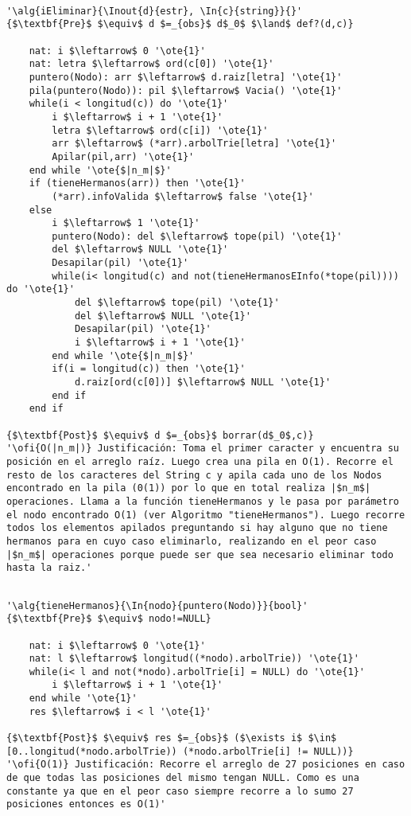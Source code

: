 \begin{lstlisting}[mathescape]

'\alg{iEliminar}{\Inout{d}{estr}, \In{c}{string}}{}'
{$\textbf{Pre}$ $\equiv$ d $=_{obs}$ d$_0$ $\land$ def?(d,c)}

	nat: i $\leftarrow$ 0 '\ote{1}'
	nat: letra $\leftarrow$ ord(c[0]) '\ote{1}'
	puntero(Nodo): arr $\leftarrow$ d.raiz[letra] '\ote{1}'
	pila(puntero(Nodo)): pil $\leftarrow$ Vacia() '\ote{1}'
	while(i < longitud(c)) do '\ote{1}'
		i $\leftarrow$ i + 1 '\ote{1}'
		letra $\leftarrow$ ord(c[i]) '\ote{1}'
		arr $\leftarrow$ (*arr).arbolTrie[letra] '\ote{1}'
		Apilar(pil,arr) '\ote{1}'
	end while '\ote{$|n_m|$}'
	if (tieneHermanos(arr)) then '\ote{1}'
		(*arr).infoValida $\leftarrow$ false '\ote{1}'
	else
		i $\leftarrow$ 1 '\ote{1}'
		puntero(Nodo): del $\leftarrow$ tope(pil) '\ote{1}'
		del $\leftarrow$ NULL '\ote{1}'
		Desapilar(pil) '\ote{1}'
		while(i< longitud(c) and not(tieneHermanosEInfo(*tope(pil)))) do '\ote{1}'
			del $\leftarrow$ tope(pil) '\ote{1}'
			del $\leftarrow$ NULL '\ote{1}'
			Desapilar(pil) '\ote{1}'
			i $\leftarrow$ i + 1 '\ote{1}'
		end while '\ote{$|n_m|$}'
		if(i = longitud(c)) then '\ote{1}'
			d.raiz[ord(c[0])] $\leftarrow$ NULL '\ote{1}'
		end if
	end if

{$\textbf{Post}$ $\equiv$ d $=_{obs}$ borrar(d$_0$,c)}
'\ofi{O(|n_m|)} Justificación: Toma el primer caracter y encuentra su posición en el arreglo raíz. Luego crea una pila en O(1). Recorre el resto de los caracteres del String c y apila cada uno de los Nodos encontrado en la pila (0(1)) por lo que en total realiza |$n_m$| operaciones. Llama a la función tieneHermanos y le pasa por parámetro el nodo encontrado O(1) (ver Algoritmo "tieneHermanos"). Luego recorre todos los elementos apilados preguntando si hay alguno que no tiene hermanos para en cuyo caso eliminarlo, realizando en el peor caso |$n_m$| operaciones porque puede ser que sea necesario eliminar todo hasta la raiz.'

\end{lstlisting}

\begin{lstlisting}[mathescape]

'\alg{tieneHermanos}{\In{nodo}{puntero(Nodo)}}{bool}'
{$\textbf{Pre}$ $\equiv$ nodo!=NULL} 

	nat: i $\leftarrow$ 0 '\ote{1}'
	nat: l $\leftarrow$ longitud((*nodo).arbolTrie)) '\ote{1}'
	while(i< l and not(*nodo).arbolTrie[i] = NULL) do '\ote{1}'
		i $\leftarrow$ i + 1 '\ote{1}'
	end while '\ote{1}' 
	res $\leftarrow$ i < l '\ote{1}'

{$\textbf{Post}$ $\equiv$ res $=_{obs}$ ($\exists i$ $\in$ [0..longitud(*nodo.arbolTrie)) (*nodo.arbolTrie[i] != NULL))}
'\ofi{O(1)} Justificación: Recorre el arreglo de 27 posiciones en caso de que todas las posiciones del mismo tengan NULL. Como es una constante ya que en el peor caso siempre recorre a lo sumo 27 posiciones entonces es O(1)'

\end{lstlisting}

